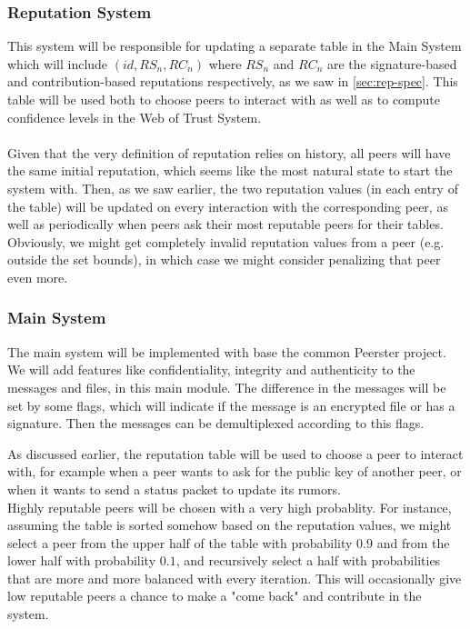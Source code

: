 \documentclass[]{article}
\begin{document}
\subsubsection{Reputation System}
This system will be responsible for updating a separate table in the Main System which will include $(id, RS_n, RC_n)$ where $RS_n$ and $RC_n$ are the signature-based and contribution-based reputations respectively, as we saw in \ref{sec:rep-spec}.
This table will be used both to choose peers to interact with as well as to compute confidence levels in the Web of Trust System.
\\\\
Given that the very definition of reputation relies on history, all peers will have the same initial reputation, which seems like the most natural state to start the system with.
Then, as we saw earlier, the two reputation values (in each entry of the table) will be updated on every interaction with the corresponding peer, as well as periodically when peers ask their most reputable peers for their tables.
\\
Obviously, we might get completely invalid reputation values from a peer (e.g. outside the set bounds), in which case we might consider penalizing that peer even more.

\subsubsection{Main System}
The main system will be implemented with base the common Peerster project. \\
We will add features like confidentiality, integrity and authenticity to the messages and files, in this main module. The difference in the messages will be set by some flags, which will indicate if the message is an encrypted file or has a signature. Then the messages can be demultiplexed according to this flags.

As discussed earlier, the reputation table will be used to choose a peer to interact with, for example when a peer wants to ask for the public key of another peer, or when it wants to send a status packet to update its rumors.
\\
Highly reputable peers will be chosen with a very high probablity. For instance, assuming the table is sorted somehow based on the reputation values, we might select a peer from the upper half of the table with probability $0.9$ and from the lower half with probability $0.1$, and recursively select a half with probabilities that are more and more balanced with every iteration.
This will occasionally give low reputable peers a chance to make a "come back" and contribute in the system.
\end{document}
